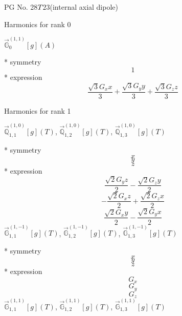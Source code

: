\documentclass[fleqn,8pt]{jsarticle}
\begin{document}
\setcounter{MaxMatrixCols}{32}

\renewcommand{\tablename}{Table~}
\renewcommand{\figurename}{Figure~}
\begin{center}
\LARGE
PG No. 28\quad$T_{\rm }$\quad$23$\quad[ cubic ] (internal axial dipole)
\end{center}

\noindent * Harmonics for rank 0

\noindent\quad $\vec{\mathbb{G}}_{0}^{(1,1)}[g](A)$

\noindent\quad ** symmetry
\begin{dmath*}
1
\end{dmath*}
\noindent\quad ** expression
\begin{dmath*}
\frac{\sqrt{3} G_{x} x}{3} + \frac{\sqrt{3} G_{y} y}{3} + \frac{\sqrt{3} G_{z} z}{3}
\end{dmath*}

\noindent * Harmonics for rank 1

\noindent\quad $\vec{\mathbb{Q}}_{1,1}^{(1,0)}[g](T)$, $\vec{\mathbb{Q}}_{1,2}^{(1,0)}[g](T)$, $\vec{\mathbb{Q}}_{1,3}^{(1,0)}[g](T)$

\noindent\quad ** symmetry
\begin{dmath*}
x
\end{dmath*}
\begin{dmath*}
y
\end{dmath*}
\begin{dmath*}
z
\end{dmath*}
\noindent\quad ** expression
\begin{dmath*}
\frac{\sqrt{2} G_{y} z}{2} - \frac{\sqrt{2} G_{z} y}{2}
\end{dmath*}
\begin{dmath*}
- \frac{\sqrt{2} G_{x} z}{2} + \frac{\sqrt{2} G_{z} x}{2}
\end{dmath*}
\begin{dmath*}
\frac{\sqrt{2} G_{x} y}{2} - \frac{\sqrt{2} G_{y} x}{2}
\end{dmath*}
\noindent\quad $\vec{\mathbb{G}}_{1,1}^{(1,-1)}[g](T)$, $\vec{\mathbb{G}}_{1,2}^{(1,-1)}[g](T)$, $\vec{\mathbb{G}}_{1,3}^{(1,-1)}[g](T)$

\noindent\quad ** symmetry
\begin{dmath*}
x
\end{dmath*}
\begin{dmath*}
y
\end{dmath*}
\begin{dmath*}
z
\end{dmath*}
\noindent\quad ** expression
\begin{dmath*}
G_{x}
\end{dmath*}
\begin{dmath*}
G_{y}
\end{dmath*}
\begin{dmath*}
G_{z}
\end{dmath*}
\noindent\quad $\vec{\mathbb{G}}_{1,1}^{(1,1)}[g](T)$, $\vec{\mathbb{G}}_{1,2}^{(1,1)}[g](T)$, $\vec{\mathbb{G}}_{1,3}^{(1,1)}[g](T)$
\end{document}
